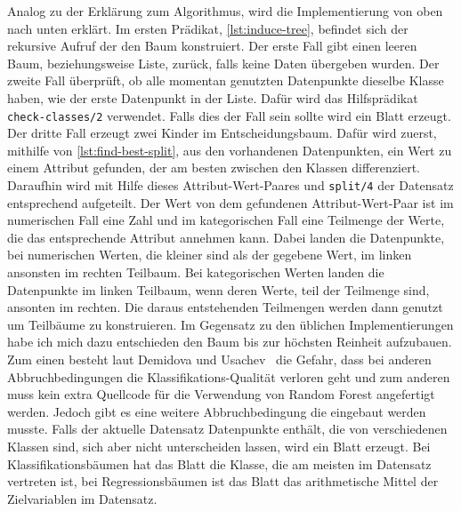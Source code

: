 Analog zu der Erklärung zum Algorithmus, wird die Implementierung von oben nach unten erklärt.
Im ersten Prädikat, \cref{lst:induce-tree}, befindet sich der rekursive Aufruf der den Baum konstruiert.
Der erste Fall gibt einen leeren Baum, beziehungsweise Liste, zurück, falls keine Daten übergeben wurden.
Der zweite Fall überprüft, ob alle momentan genutzten Datenpunkte dieselbe Klasse haben, wie der erste Datenpunkt
in der Liste. Dafür wird das Hilfsprädikat \texttt{check-classes/2} verwendet. Falls dies der Fall sein sollte wird ein Blatt erzeugt.
Der dritte Fall erzeugt zwei Kinder im Entscheidungsbaum. Dafür wird zuerst, mithilfe von \cref{lst:find-best-split},
aus den vorhandenen Datenpunkten, ein Wert zu einem Attribut gefunden, der am besten zwischen den Klassen
differenziert. Daraufhin wird mit Hilfe dieses Attribut-Wert-Paares und \texttt{split/4} der Datensatz entsprechend aufgeteilt.
Der Wert von dem gefundenen Attribut-Wert-Paar ist im numerischen Fall eine Zahl und im kategorischen Fall eine Teilmenge der Werte,
die das entsprechende Attribut annehmen kann.
Dabei landen die Datenpunkte, bei numerischen Werten, die kleiner sind als der gegebene Wert, im linken ansonsten im rechten Teilbaum.
Bei kategorischen Werten landen die Datenpunkte im linken Teilbaum, wenn deren Werte, teil der Teilmenge sind, ansonten im rechten.
Die daraus entstehenden Teilmengen werden dann genutzt um Teilbäume zu konstruieren.
Im Gegensatz zu den üblichen Implementierungen habe ich mich dazu entschieden den Baum bis zur höchsten Reinheit aufzubauen.
Zum einen besteht laut Demidova und Usachev~\cite{Demidova_2020} die Gefahr, dass bei anderen Abbruchbedingungen
die Klassifikations-Qualität verloren geht und zum anderen muss kein extra Quellcode für die Verwendung von Random Forest
angefertigt werden.
Jedoch gibt es eine weitere Abbruchbedingung die eingebaut werden musste. Falls der aktuelle Datensatz Datenpunkte
enthält, die von verschiedenen Klassen sind, sich aber nicht unterscheiden lassen, wird ein Blatt erzeugt.
Bei Klassifikationsbäumen hat das Blatt die Klasse, die am meisten im Datensatz vertreten ist, bei Regressionsbäumen
ist das Blatt das arithmetische Mittel der Zielvariablen im Datensatz.
